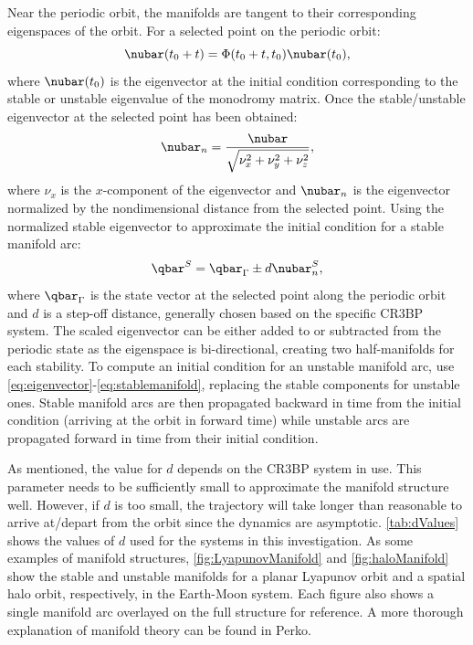 Near the periodic orbit, the manifolds are tangent to their corresponding eigenspaces of the orbit.
For a selected point on the periodic orbit:
\begin{equation}
    \nubar(t_{0}+t)=\Phi(t_{0}+t,t_{0})\nubar(t_{0}),
    \label{eq:eigenvector}
\end{equation}
where $\nubar(t_{0})$ is the eigenvector at the initial condition corresponding to the stable or
unstable eigenvalue of the monodromy matrix. Once the stable/unstable eigenvector at the selected
point has been obtained:
\begin{equation}
    \nubar_{n}=\frac{\nubar}{\sqrt{\nu_{x}^{2}+\nu_{y}^{2}+\nu_{z}^{2}}},
    \label{eq:normeigenvector}
\end{equation}
where $\nu_{x}$ is the $x$-component of the eigenvector and $\nubar_{n}$ is the eigenvector
normalized by the nondimensional distance from the selected point. Using the normalized
stable eigenvector to approximate the initial condition for a stable manifold arc:
\begin{equation}
    \qbar^{S}=\qbar_{\Gamma}\pm d\nubar_{n}^{S},
    \label{eq:stablemanifold}
\end{equation}
where $\qbar_{\Gamma}$ is the state vector at the selected point along the periodic orbit and $d$
is a step-off distance, generally chosen based on the specific CR3BP system. The scaled eigenvector
can be either added to or subtracted from the periodic state as the eigenspace is bi-directional,
creating two half-manifolds for each stability. To compute an initial condition for an unstable
manifold arc, use \cref{eq:eigenvector}-\cref{eq:stablemanifold}, replacing the stable components
for unstable ones. Stable manifold arcs are then propagated backward in time from the initial
condition (arriving at the orbit in forward time) while unstable arcs are propagated forward in
time from their initial condition.

As mentioned, the value for $d$ depends on the CR3BP system in use. This parameter needs to be
sufficiently small to approximate the manifold structure well. However, if $d$ is too small, the
trajectory will take longer than reasonable to arrive at/depart from the orbit since the dynamics
are asymptotic\cite{Kakoi:2015}. \cref{tab:dValues} shows the values of $d$ used for the systems in
this investigation. As some examples of manifold structures, \cref{fig:LyapunovManifold} and
\cref{fig:haloManifold} show the stable and unstable manifolds for a planar Lyapunov orbit and a
spatial halo orbit, respectively, in the Earth-Moon system. Each figure also shows a single
manifold arc overlayed on the full structure for reference. A more thorough explanation of manifold
theory can be found in Perko\cite{Perko:1991}.


